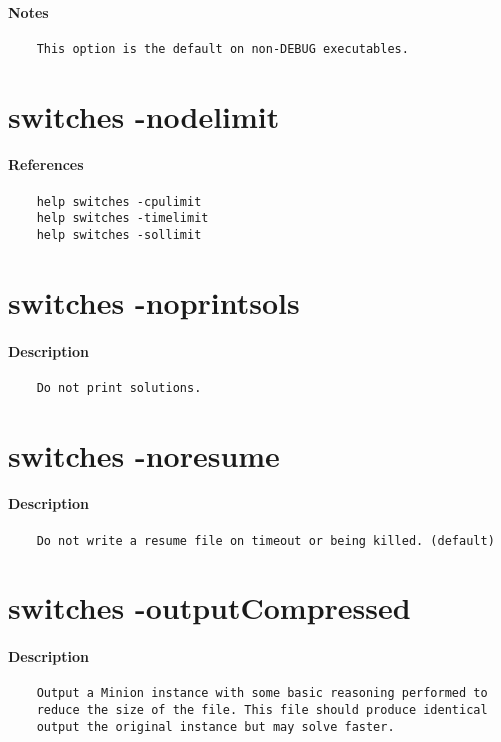 \paragraph{Notes}
{\footnotesize
\begin{verbatim}
    This option is the default on non-DEBUG executables.
\end{verbatim}
}
\section{switches -nodelimit}
\paragraph{References}
{\footnotesize
\begin{verbatim}
    help switches -cpulimit
    help switches -timelimit
    help switches -sollimit
\end{verbatim}
}
\section{switches -noprintsols}
\paragraph{Description}
{\footnotesize
\begin{verbatim}
    Do not print solutions.
\end{verbatim}
}
\section{switches -noresume}
\paragraph{Description}
{\footnotesize
\begin{verbatim}
    Do not write a resume file on timeout or being killed. (default)
\end{verbatim}
}
\section{switches -outputCompressed}
\paragraph{Description}
{\footnotesize
\begin{verbatim}
    Output a Minion instance with some basic reasoning performed to
    reduce the size of the file. This file should produce identical
    output the original instance but may solve faster.
\end{verbatim}
}
